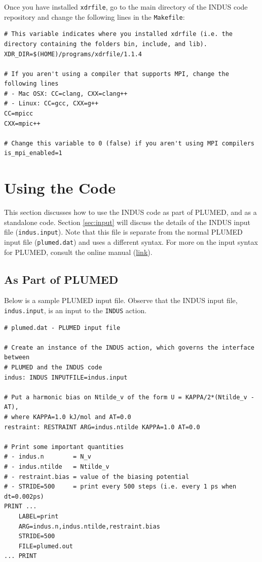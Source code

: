 \documentclass[11pt,notitlepage]{article}
\newcommand{\plumedmanual}[1][link]{\href{https://plumed.github.io/doc.html}{#1}}
\begin{document}
Once you have installed \texttt{xdrfile}, go to the main directory of the INDUS code repository and change the following lines in the \texttt{Makefile}:

\begin{lstlisting}[mathescape=false]
# This variable indicates where you installed xdrfile (i.e. the directory containing the folders bin, include, and lib).
XDR_DIR=$(HOME)/programs/xdrfile/1.1.4

# If you aren't using a compiler that supports MPI, change the following lines
# - Mac OSX: CC=clang, CXX=clang++
# - Linux: CC=gcc, CXX=g++
CC=mpicc
CXX=mpic++

# Change this variable to 0 (false) if you aren't using MPI compilers
is_mpi_enabled=1
\end{lstlisting}


\section{Using the Code}


This section discusses how to use the INDUS code as part of PLUMED, and as a standalone code. Section \ref{sec:input} will discuss the details of the INDUS input file (\texttt{indus.input}). Note that this file is separate from the normal PLUMED input file (\texttt{plumed.dat}) and uses a different syntax. For more on the input syntax for PLUMED, consult the online manual (\plumedmanual).


\subsection{As Part of PLUMED}

Below is a sample PLUMED input file. Observe that the INDUS input file, \texttt{indus.input}, is an input to the \texttt{INDUS} action.

\begin{lstlisting}
# plumed.dat - PLUMED input file

# Create an instance of the INDUS action, which governs the interface between
# PLUMED and the INDUS code
indus: INDUS INPUTFILE=indus.input

# Put a harmonic bias on Ntilde_v of the form U = KAPPA/2*(Ntilde_v - AT),
# where KAPPA=1.0 kJ/mol and AT=0.0
restraint: RESTRAINT ARG=indus.ntilde KAPPA=1.0 AT=0.0 

# Print some important quantities
# - indus.n        = N_v
# - indus.ntilde   = Ntilde_v
# - restraint.bias = value of the biasing potential
# - STRIDE=500     = print every 500 steps (i.e. every 1 ps when dt=0.002ps)
PRINT ...
	LABEL=print
	ARG=indus.n,indus.ntilde,restraint.bias
	STRIDE=500
	FILE=plumed.out
... PRINT
\end{lstlisting}
\end{document}

